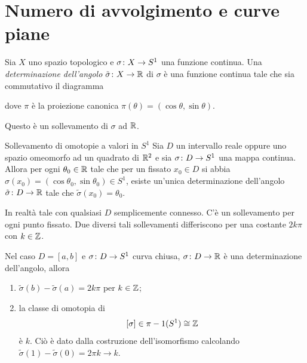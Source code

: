 \documentclass[a4paper]{article}
\begin{document}
\section{Numero di avvolgimento e curve piane}

\begin{snippetdefinition}{}
    Sia \(X\) uno spazio topologico e \(\sigma \colon X \to S^1\)
    una funzione continua. Una \emph{determinazione dell'angolo}
    \(\tilde \sigma \colon X \to \mathbb{R}\) di \(\sigma\)
    è una funzione continua tale che
    sia commutativo il diagramma
    \begin{center}
    \end{center}
    dove \(\pi\) è la proiezione canonica \(\pi(\theta) = (\cos\theta, \sin\theta)\).
\end{snippetdefinition}

Questo è un sollevamento di \(\sigma\) ad \(\mathbb{R}\).

\begin{snippetdefinition}{Sollevamento di omotopie a valori in \(S^1\)}
    Sia \(D\) un intervallo reale oppure uno spazio omeomorfo
    ad un quadrato
    di \(\mathbb{R}^2\)
    e sia \(\sigma \colon D \to S^1\) una mappa continua.
    Allora per ogni \(\theta_0 \in \mathbb{R}\) tale che per un fissato
    \(x_0 \in D\) si abbia \(\sigma(x_0) = (\cos\theta_0, \sin\theta_0) \in S^1\),
    esiste un'unica determinazione dell'angolo
    \(\tilde \sigma \colon D \to \mathbb{R}\) tale che \(\tilde \sigma(x_0) = \theta_0\).
\end{snippetdefinition}

In realtà tale con qualsiasi \(D\) semplicemente connesso.
C'è un sollevamento per ogni punto fissato.
Due diversi tali sollevamenti differiscono per una costante \(2k\pi\) con \(k \in \mathbb{Z}\).

Nel caso \(D=[a,b]\) e \(\sigma \colon D \to S^1\) curva chiusa,
\(\sigma \colon D \to \mathbb{R}\) è una determinazione dell'angolo, allora
\begin{enumerate}
    \item \(\tilde \sigma(b) - \tilde \sigma(a) = 2k\pi\) per \(k \in \mathbb{Z}\);
    \item la classe di omotopia di 
    \[
        [\sigma] \in \pi-1(S^1) \cong \mathbb{Z}
    \]
    è \(k\).
    Ciò è dato dalla costruzione dell'isomorfismo calcolando
    \(\tilde \sigma(1) - \tilde \sigma(0) = 2\pi k \to k\).
\end{enumerate}
\end{document}
